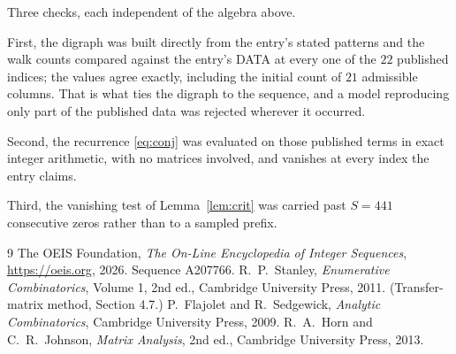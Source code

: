 \documentclass[11pt,a4paper]{article}
\theoremstyle{plain}
\theoremstyle{definition}
\begin{document}
Three checks, each independent of the algebra above.

First, the digraph was built directly from the entry's stated patterns and the walk counts
compared against the entry's DATA at every one of the $22$ published indices; the
values agree exactly, including the initial count of $21$ admissible columns. That is
what ties the digraph to the sequence, and a model reproducing only part of the published
data was rejected wherever it occurred.

Second, the recurrence \eqref{eq:conj} was evaluated on those published terms in exact
integer arithmetic, with no matrices involved, and vanishes at every index the entry claims.

Third, the vanishing test of Lemma~\ref{lem:crit} was carried past $S=441$ consecutive
zeros rather than to a sampled prefix.

\begin{thebibliography}{9}
 The OEIS Foundation, \emph{The On-Line Encyclopedia of Integer
Sequences}, \url{https://oeis.org}, 2026. Sequence A207766.
 R.~P.~Stanley, \emph{Enumerative Combinatorics}, Volume 1, 2nd ed.,
Cambridge University Press, 2011. (Transfer-matrix method, Section 4.7.)
 P.~Flajolet and R.~Sedgewick, \emph{Analytic Combinatorics}, Cambridge
University Press, 2009.
 R.~A.~Horn and C.~R.~Johnson, \emph{Matrix Analysis}, 2nd ed., Cambridge
University Press, 2013.
\end{thebibliography}
\end{document}

